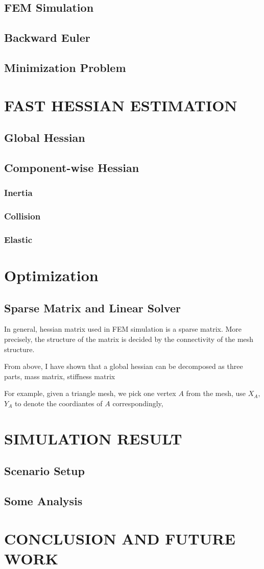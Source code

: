 \documentclass[
	11pt, 
	a4paper, 
	oneside,  
	final, 
]{report}
\begin{document}
\section{FEM Simulation}
\section{Backward Euler}
\section{Minimization Problem}
\chapter{FAST HESSIAN ESTIMATION}
\section{Global Hessian}



\section{Component-wise Hessian}
\subsection{Inertia}
\subsection{Collision}
\subsection{Elastic}
\chapter{Optimization}
\section{Sparse Matrix and Linear Solver}


In general, hessian matrix used in FEM simulation is a sparse matrix. More precisely, the structure of the matrix is decided by the connectivity of the mesh structure.

From above, I have shown that a global hessian can be decomposed as three parts, mass matrix, stiffness matrix

For example, given a triangle mesh, we pick one vertex $A$ from the mesh, use $X_A$, $Y_A$ to denote the coordiantes of $A$ correspondingly, 

\chapter{SIMULATION RESULT}
\section{Scenario Setup}
\section{Some Analysis}
\chapter{CONCLUSION AND FUTURE WORK}




\end{document}
